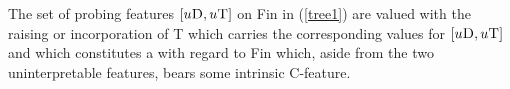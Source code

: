 \documentclass[output=paper]{langsci/langscibook}
\begin{document}
The set of probing features $[u\textsc{D},u\textsc{T}]$ on Fin in
(\ref{tree1}) are valued with the raising or incorporation of T which
carries the corresponding values for $[u\textsc{D},u\textsc{T}]$ and which
constitutes a  with regard to Fin which, aside
from the two uninterpretable features, bears some intrinsic C-feature.

\begin{exe}

	\ex
	\hfill
\hfill\null
	\label{tree2}
\end{exe}
\end{document}
